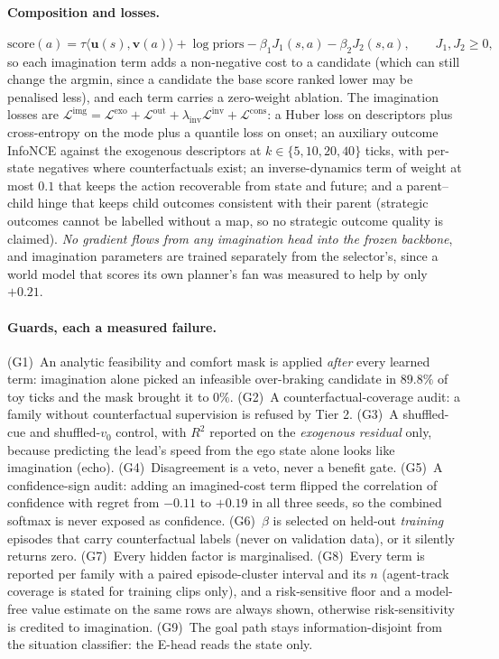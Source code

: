 \paragraph{Composition and losses.}
\begin{equation}
\text{score}(a)=\tau\langle\mathbf u(s),\mathbf v(a)\rangle+\log\text{priors}-\beta_1J_1(s,a)-\beta_2J_2(s,a),\qquad J_1,J_2\ge0,
\end{equation}
so each imagination term adds a non-negative cost to a candidate (which can still change the argmin, since a candidate the base score ranked lower may be penalised less), and each term carries a zero-weight ablation. The imagination losses are $\mathcal L^{\text{img}}=\mathcal L^{\text{exo}}+\mathcal L^{\text{out}}+\lambda_{\text{inv}}\mathcal L^{\text{inv}}+\mathcal L^{\text{cons}}$: a Huber loss on descriptors plus cross-entropy on the mode plus a quantile loss on onset; an auxiliary outcome InfoNCE against the exogenous descriptors at $k\in\{5,10,20,40\}$ ticks, with per-state negatives where counterfactuals exist; an inverse-dynamics term of weight at most $0.1$ that keeps the action recoverable from state and future; and a parent--child hinge that keeps child outcomes consistent with their parent (strategic outcomes cannot be labelled without a map, so no strategic outcome quality is claimed).
\emph{No gradient flows from any imagination head into the frozen backbone}, and imagination parameters are trained separately from the selector's, since a world model that scores its own planner's fan was measured to help by only $+0.21$\evI.

\paragraph{Guards, each a measured failure.}
(G1)~An analytic feasibility and comfort mask is applied \emph{after} every learned term: imagination alone picked an infeasible over-braking candidate in $89.8\%$ of toy ticks and the mask brought it to $0\%$. (G2)~A counterfactual-coverage audit: a family without counterfactual supervision is refused by Tier 2. (G3)~A shuffled-cue and shuffled-$v_0$ control, with $R^2$ reported on the \emph{exogenous residual} only, because predicting the lead's speed from the ego state alone looks like imagination (echo). (G4)~Disagreement is a veto, never a benefit gate. (G5)~A confidence-sign audit: adding an imagined-cost term flipped the correlation of confidence with regret from $-0.11$ to $+0.19$ in all three seeds, so the combined softmax is never exposed as confidence. (G6)~$\beta$ is selected on held-out \emph{training} episodes that carry counterfactual labels (never on validation data), or it silently returns zero. (G7)~Every hidden factor is marginalised. (G8)~Every term is reported per family with a paired episode-cluster interval and its $n$ (agent-track coverage is stated for training clips only), and a risk-sensitive floor and a model-free value estimate on the same rows are always shown, otherwise risk-sensitivity is credited to imagination. (G9)~The goal path stays information-disjoint from the situation classifier: the E-head reads the state only.

